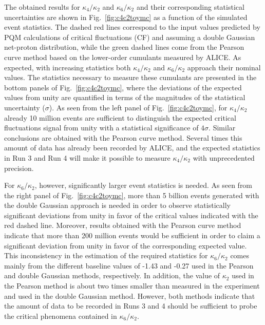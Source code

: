 The obtained results for $\kappa_{4}/\kappa_{2}$ and $\kappa_{6}/\kappa_{2}$ and their corresponding statistical uncertainties are shown in Fig.~\ref{fig:c4c2toymc} as a function of the simulated event statistics. The dashed red lines correspond to the input values predicted by PQM calculations of critical fluctuations (CF) and assuming a double Gaussian net-proton distribution, while the green dashed lines come from the Pearson curve method based on the lower-order cumulants measured by ALICE. As expected, with increasing statistics both $\kappa_{4}/\kappa_{2}$ and $\kappa_{6}/\kappa_{2}$ approach their nominal values. The statistics necessary to measure these cumulants are presented in the bottom panels of Fig.~\ref{fig:c4c2toymc}, where the deviations of the expected values from unity are quantified in terms of the magnitudes of the statistical uncertainty ($\sigma$). As seen from the left panel of Fig.~\ref{fig:c4c2toymc}, for $\kappa_{4}/\kappa_{2}$ already 10 million events are sufficient to distinguish the expected critical fluctuations signal from  unity with a statistical significance of $4\sigma$. Similar conclusions are obtained with the Pearson curve method.  Several times this amount of data has already been recorded by ALICE, and the expected statistics in Run 3 and Run 4 will make it possible to measure  $\kappa_{4}/\kappa_{2}$ with unprecedented precision.  

For $\kappa_{6}/\kappa_{2}$, however, significantly larger event statistics is needed. As seen from the right panel of Fig.~\ref{fig:c4c2toymc}, more than 5 billion events generated with the double Gaussian approach is needed in order to observe statistically significant deviations from unity in favor of the critical values indicated with the red dashed line. Moreover, results obtained with the Pearson curve method indicate that more than 200 million events would be sufficient in order to claim a significant deviation from unity in favor of the corresponding expected value. This inconsistency in the estimation of the required statistics for $\kappa_{6}/\kappa_{2}$ comes mainly from the different baseline values of -1.43 and -0.27 used in the Pearson and double Gaussian methods, respectively. In addition, the value of $\kappa_{2}$ used in the Pearson method is about two times smaller than measured in the experiment and used in the double Gaussian method. However, both methods indicate that the amount of data to be recorded in Runs 3 and 4 should be sufficient to probe the critical phenomena contained in $\kappa_{6}/\kappa_{2}$. 
      
